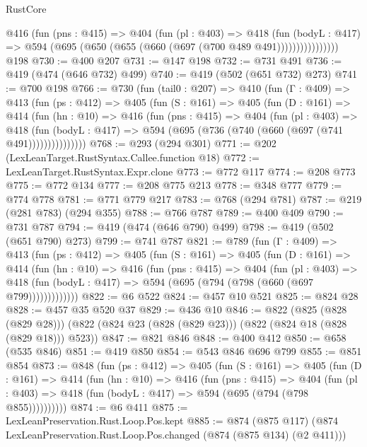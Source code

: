 \begin{lexlean}{RustCore}
\begin{coremodule}
{\begin{coremodule}
{{{{{                @416
                  (fun (pns : @415) =>
                  @404
                    (fun (pl : @403) =>
                    @418
                      (fun (bodyL : @417) =>
                      @594 (@695 (@650 (@655 (@660 (@697 (@700 @489 @491))))))))))))))))
    @198
@730 := @400 @207
@731 := @147 @198
@732 := @731 @491
@736 := @419 (@474 (@646 @732) @499)
@740 := @419 (@502 (@651 @732) @273)
@741 := @700 @198
@766 := @730
    (fun (tail0 : @207) =>
    @410
      (fun (Γ : @409) =>
      @413
        (fun (ps : @412) =>
        @405
          (fun (S : @161) =>
          @405
            (fun (D : @161) =>
            @414
              (fun (hn : @10) =>
              @416
                (fun (pns : @415) =>
                @404
                  (fun (pl : @403) =>
                  @418
                    (fun (bodyL : @417) =>
                    @594 (@695 (@736 (@740 (@660 (@697 (@741 @491)))))))))))))))
@768 := @293 (@294 @301)
@771 := @202 (LexLeanTarget.RustSyntax.Callee.function @18)
@772 := LexLeanTarget.RustSyntax.Expr.clone
@773 := @772 @117
@774 := @208 @773
@775 := @772 @134
@777 := @208 @775 @213
@778 := @348 @777
@779 := @774 @778
@781 := @771 @779 @217
@783 := @768 (@294 @781)
@787 := @219 (@281 @783) (@294 @355)
@788 := @766 @787
@789 := @400 @409
@790 := @731 @787
@794 := @419 (@474 (@646 @790) @499)
@798 := @419 (@502 (@651 @790) @273)
@799 := @741 @787
@821 := @789
    (fun (Γ : @409) =>
    @413
      (fun (ps : @412) =>
      @405
        (fun (S : @161) =>
        @405
          (fun (D : @161) =>
          @414
            (fun (hn : @10) =>
            @416
              (fun (pns : @415) =>
              @404
                (fun (pl : @403) =>
                @418 (fun (bodyL : @417) => @594 (@695 (@794 (@798 (@660 (@697 @799)))))))))))))
@822 := @6 @522
@824 := @457 @10 @521
@825 := @824 @28
@828 := @457 @35 @520 @37
@829 := @436 @10
@846 := @822
    (@825 (@828 (@829 @28)))
    (@822 (@824 @23 (@828 (@829 @23))) (@822 (@824 @18 (@828 (@829 @18))) @523))
@847 := @821 @846
@848 := @400 @412
@850 := @658 (@535 @846)
@851 := @419 @850
@854 := @543 @846 @696 @799
@855 := @851 @854
@873 := @848
    (fun (ps : @412) =>
    @405
      (fun (S : @161) =>
      @405
        (fun (D : @161) =>
        @414
          (fun (hn : @10) =>
          @416
            (fun (pns : @415) =>
            @404
              (fun (pl : @403) => @418 (fun (bodyL : @417) => @594 (@695 (@794 (@798 @855))))))))))
@874 := @6 @411
@875 := LexLeanPreservation.Rust.Loop.Pos.kept
@885 := @874
    (@875 @117)
    (@874 LexLeanPreservation.Rust.Loop.Pos.changed (@874 (@875 @134) (@2 @411)))
}}}}}
\end{coremodule}}
\end{coremodule}
\end{lexlean}
